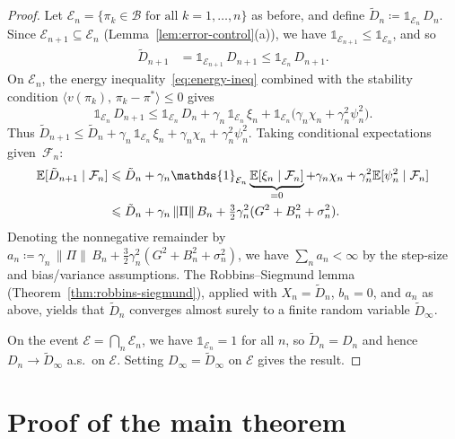 \documentclass[a4paper,oneside,11pt]{report}
\newcommand{\ind}{\mathds{1}}
\newcommand{\calF}{\mathcal{F}}
\newcommand{\calB}{\mathcal{B}}
\newcommand{\calE}{\mathcal{E}}
\newcommand{\ip}[2]{\langle #1,\, #2 \rangle}
\newcommand{\norm}[1]{\| #1 \|}
\numberwithin{theorem}{chapter}
\numberwithin{equation}{chapter}
\begin{document}
\begin{proof}
  Let $\calE_n = \{\pi_k \in \calB \text{ for all } k = 1, \ldots, n\}$
  as before, and define
  $\tilde D_n \coloneqq \ind_{\calE_n}\, D_n$. Since
  $\calE_{n+1} \subseteq \calE_n$ (Lemma~\ref{lem:error-control}(a)), we
  have $\ind_{\calE_{n+1}} \le \ind_{\calE_n}$, and so
  \begin{align}
    \tilde D_{n+1}
    &= \ind_{\calE_{n+1}}\, D_{n+1}
    \le \ind_{\calE_n}\, D_{n+1}.
    \label{eq:Dtilde-bound}
  \end{align}
  On $\calE_n$, the energy inequality~\eqref{eq:energy-ineq} combined
  with the stability condition
  $\ip{v(\pi_k)}{\pi_k - \pi^*} \le 0$ gives
  \begin{equation}
    \ind_{\calE_n}\, D_{n+1}
    \le \ind_{\calE_n}\, D_n
    + \gamma_n\, \ind_{\calE_n}\, \xi_n
    + \ind_{\calE_n}\bigl(\gamma_n \chi_n + \gamma_n^2 \psi_n^2\bigr).
    \label{eq:Dtilde-ineq}
  \end{equation}
  Thus
  $\tilde D_{n+1} \le \tilde D_n
  + \gamma_n\, \ind_{\calE_n}\, \xi_n
  + \gamma_n \chi_n + \gamma_n^2 \psi_n^2$.
  Taking conditional expectations given~$\calF_n$:
  \begin{align}
    \E[\tilde D_{n+1} \mid \calF_n]
    &\le \tilde D_n + \gamma_n \ind_{\calE_n}
      \underbrace{\E[\xi_n \mid \calF_n]}_{= 0}
      + \gamma_n \chi_n
      + \gamma_n^2 \E[\psi_n^2 \mid \calF_n]
    \notag\\
    &\le \tilde D_n + \gamma_n\, \norm{\Pi}\, B_n
      + \tfrac{3}{2}\gamma_n^2 (G^2 + B_n^2 + \sigma_n^2).
    \label{eq:Dtilde-cond-exp}
  \end{align}
  Denoting the nonnegative remainder by
  $a_n \coloneqq \gamma_n\, \norm{\Pi}\, B_n
  + \tfrac{3}{2}\gamma_n^2 (G^2 + B_n^2 + \sigma_n^2)$, we have
  $\sum_n a_n < \infty$ by the step-size and bias/variance assumptions.
  The Robbins--Siegmund lemma (Theorem~\ref{thm:robbins-siegmund}),
  applied with $X_n = \tilde D_n$, $b_n = 0$, and $a_n$ as above,
  yields that $\tilde D_n$ converges almost surely to a finite random
  variable $\tilde D_\infty$.

  On the event $\calE = \bigcap_n \calE_n$, we have
  $\ind_{\calE_n} = 1$ for all $n$, so $\tilde D_n = D_n$ and hence
  $D_n \to \tilde D_\infty$ a.s.\ on $\calE$. Setting
  $D_\infty = \tilde D_\infty$ on $\calE$ gives the result.
\end{proof}

\section{Proof of the main theorem}
\label{sec:final-proof}
\end{document}
